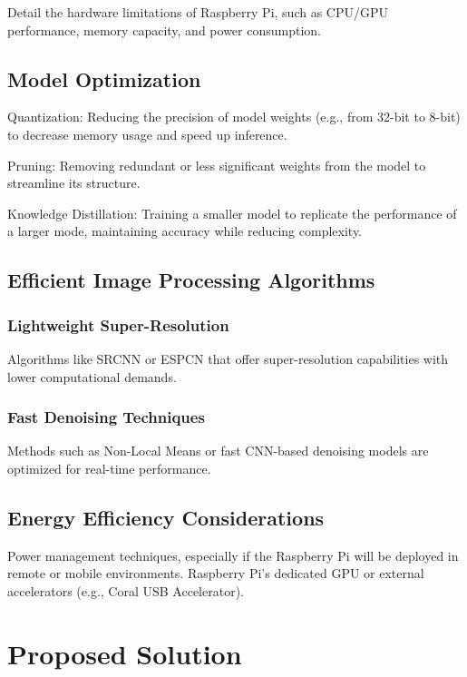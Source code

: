 Detail the hardware limitations of Raspberry Pi, such as CPU/GPU performance, memory capacity, and power consumption.

\subsection{Model Optimization}
\label{subsec:model-optimization}


\item Quantization: Reducing the precision of model weights (e.g., from 32-bit to 8-bit) to decrease memory usage
and speed up inference.
\item Pruning: Removing redundant or less significant weights from the model to streamline its structure.
\item Knowledge Distillation: Training a smaller model to replicate the performance of a larger mode,
maintaining accuracy while reducing complexity.

\subsection{Efficient Image Processing Algorithms}
\label{subsec:efficient-image-processing-algorithms}

\subsubsection{Lightweight Super-Resolution}

\item Algorithms like SRCNN or ESPCN that offer super-resolution capabilities with lower computational demands.

\subsubsection{Fast Denoising Techniques}

\item Methods such as Non-Local Means or fast CNN-based denoising models are optimized for real-time performance.

\subsection{Energy Efficiency Considerations}
\label{subsec:energy-efficiency-considerations}


Power management techniques, especially if the Raspberry Pi will be deployed in remote or mobile environments.
Raspberry Pi’s dedicated GPU or external accelerators (e.g., Coral USB Accelerator).


\section{Proposed Solution}
\label{sec:proposed-solution}


